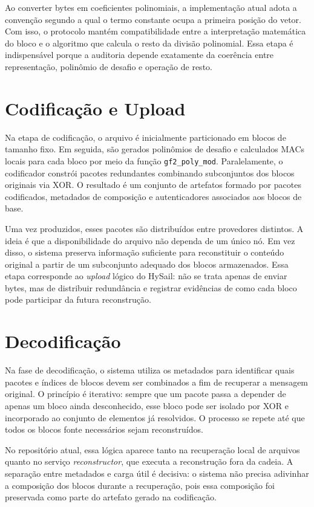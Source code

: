 Ao converter bytes em coeficientes polinomiais, a implementação atual adota a convenção segundo a qual o termo constante ocupa a primeira posição do vetor. Com isso, o protocolo mantém compatibilidade entre a interpretação matemática do bloco e o algoritmo que calcula o resto da divisão polinomial. Essa etapa é indispensável porque a auditoria depende exatamente da coerência entre representação, polinômio de desafio e operação de resto.

\section{Codificação e Upload}%
Na etapa de codificação, o arquivo é inicialmente particionado em blocos de tamanho fixo. Em seguida, são gerados polinômios de desafio e calculados MACs locais para cada bloco por meio da função \texttt{gf2\_poly\_mod}. Paralelamente, o codificador constrói pacotes redundantes combinando subconjuntos dos blocos originais via XOR. O resultado é um conjunto de artefatos formado por pacotes codificados, metadados de composição e autenticadores associados aos blocos de base.

Uma vez produzidos, esses pacotes são distribuídos entre provedores distintos. A ideia é que a disponibilidade do arquivo não dependa de um único nó. Em vez disso, o sistema preserva informação suficiente para reconstituir o conteúdo original a partir de um subconjunto adequado dos blocos armazenados. Essa etapa corresponde ao \emph{upload} lógico do HySail: não se trata apenas de enviar bytes, mas de distribuir redundância e registrar evidências de como cada bloco pode participar da futura reconstrução.

\section{Decodificação}%
Na fase de decodificação, o sistema utiliza os metadados para identificar quais pacotes e índices de blocos devem ser combinados a fim de recuperar a mensagem original. O princípio é iterativo: sempre que um pacote passa a depender de apenas um bloco ainda desconhecido, esse bloco pode ser isolado por XOR e incorporado ao conjunto de elementos já resolvidos. O processo se repete até que todos os blocos fonte necessários sejam reconstruídos.

No repositório atual, essa lógica aparece tanto na recuperação local de arquivos quanto no serviço \emph{reconstructor}, que executa a reconstrução fora da cadeia. A separação entre metadados e carga útil é decisiva: o sistema não precisa adivinhar a composição dos blocos durante a recuperação, pois essa composição foi preservada como parte do artefato gerado na codificação.

